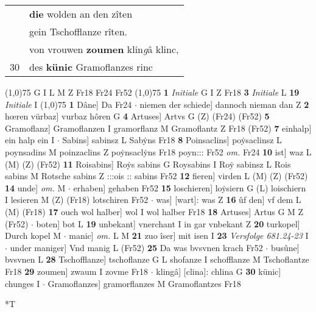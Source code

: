 \documentclass[8pt,a4paper,notitlepage]{article}
\begin{document}
\begin{table}[ht]
\begin{minipage}[t]{0.5\linewidth}
\begin{tabular}{rl}
 & \textbf{die} wolden an den zîten\\ 
 & gein Tschofflanze rîten.\\ 
 & von vrouwen \textbf{zoumen} klin\textit{g}â klinc,\\ 
30 & des \textbf{künic} Gramoflanzes rinc\\ 
\end{tabular}
\scriptsize
\line(1,0){75} \newline
G I L M Z Fr18 Fr24 Fr52 \newline
\line(1,0){75} \newline
\textbf{1} \textit{Initiale} G I Z Fr18  \textbf{3} \textit{Initiale} L  \textbf{19} \textit{Initiale} I  \newline
\line(1,0){75} \newline
\textbf{1} Dâne] Da Fr24  $\cdot$ niemen der schiede] dannoch nieman dan Z \textbf{2} hœren vürbaz] vurbaz hôren G \textbf{4} Artuses] Artvs G (Z) (Fr24) (Fr52) \textbf{5} Gramoflanz] Gramoflanzen I gramorflanz M Gramoflantz Z Fr18 (Fr52) \textbf{7} einhalp] ein halp ein I  $\cdot$ Sabins] sabinsz L Sabẏns Fr18 \textbf{8} Poinsaclins] poẏsaclinsz L poynsadins M poinzaclins Z poẏnsaclẏns Fr18 poyn::: Fr52 \textit{om.} Fr24 \textbf{10} ist] waz L (M) (Z) (Fr52) \textbf{11} Roisabins] Roẏs sabins G Roysabins I Roẏ sabinsz L Rois sabins M Rotsche sabins Z :::ois :: sabins Fr52 \textbf{12} fieren] virden L (M) (Z) (Fr52) \textbf{14} unde] \textit{om.} M  $\cdot$ erhaben] gehaben Fr52 \textbf{15} loschieren] loẏsiern G (L) loischiern I lesieren M (Z) (Fr18) lotschiren Fr52  $\cdot$ was] [wart]: was Z \textbf{16} ûf den] vf dem L (M) (Fr18) \textbf{17} ouch wol halber] wol I wol halber Fr18 \textbf{18} Artuses] Artus G M Z (Fr52)  $\cdot$ boten] bot L \textbf{19} unbekant] vnerchant I in gar vnbekant Z \textbf{20} turkopel] Durch kopel M  $\cdot$ manic] \textit{om.} L M \textbf{21} zuo îser] mit isen I \textbf{23} \textit{Versfolge 681.24-23} I   $\cdot$ under maniger] Vnd manig L (Fr52) \textbf{25} Da was bvsvnen krach Fr52  $\cdot$ busûne] bvsvnen L \textbf{28} Tschofflanze] tschoflanze G L shofanze I schofflanze M Tschoflantze Fr18 \textbf{29} zoumen] zwaum I zovme Fr18  $\cdot$ klingâ] [clina]: chlina G \textbf{30} künic] chunges I  $\cdot$ Gramoflanzes] gramorflanzes M Gramoflantzes Fr18 \newline
\end{minipage}
\hspace{0.5cm}
\begin{minipage}[t]{0.5\linewidth}
\small
\begin{center}*T

\end{center}
\end{minipage}
\end{table}
\end{document}
